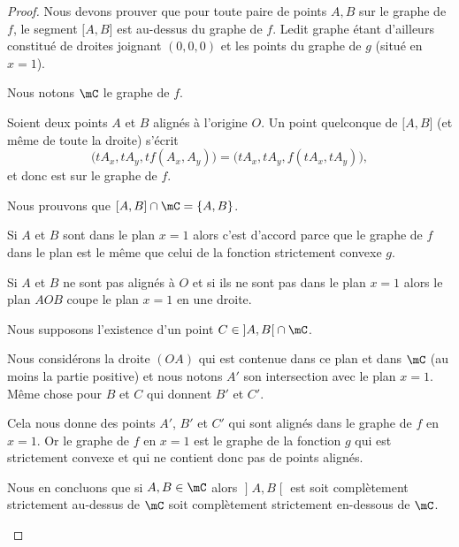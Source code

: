 \begin{proof}
	Nous devons prouver que pour toute paire de points \( A,B\) sur le graphe de \( f\), le segment \( \mathopen[ A , B \mathclose]\) est au-dessus du graphe de \( f\). Ledit graphe étant d'ailleurs constitué de droites joignant \( (0,0,0)\) et les points du graphe de \( g\) (situé en \( x=1\)).

	Nous notons \( \mC\) le graphe de \( f\).

	\begin{subproof}
		Soient deux points \( A\) et \( B\) alignés à l'origine \( O\). Un point quelconque de \( \mathopen[ A , B \mathclose]\) (et même de toute la droite) s'écrit
		\begin{equation}
			\big( tA_x,tA_y,tf(A_x,A_y) \big)=\big( tA_x,tA_y,f(tA_x,tA_y) \big),
		\end{equation}
		et donc est sur le graphe de \( f\).

		Nous prouvons que \( \mathopen[ A , B \mathclose]\cap \mC=\{ A,B \}\).

		Si \( A\) et \( B\) sont dans le plan \( x=1\) alors c'est d'accord parce que le graphe de \( f\) dans le plan est le même que celui de la fonction strictement convexe \( g\).

		Si \( A\) et \( B\) ne sont pas alignés à \( O\) et si ils ne sont pas dans le plan \( x=1\) alors le plan \( AOB\) coupe le plan \( x=1\) en une droite.

		Nous supposons l'existence d'un point \( C\in \mathopen] A , B \mathclose[\cap\mC\).

			Nous considérons la droite \( (OA)\) qui est contenue dans ce plan et dans \( \mC\) (au moins la partie positive) et nous notons \( A'\) son intersection avec le plan \( x=1\). Même chose pour \( B\) et \( C\) qui donnent \( B'\) et \( C'\).

			Cela nous donne des points \( A'\), \( B'\) et \( C'\) qui sont alignés dans le graphe de \( f\) en \( x=1\). Or le graphe de \( f\) en \( x=1\) est le graphe de la fonction \( g\) qui est strictement convexe et qui ne contient donc pas de points alignés.

			Nous en concluons que si \( A,B\in\mC\) alors \( \mathopen] A , B \mathclose[\) est soit complètement strictement au-dessus de \( \mC\) soit complètement strictement en-dessous de \( \mC\).

	\end{subproof}


\end{proof}
